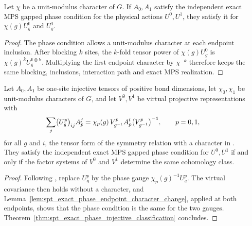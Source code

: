\begin{lemma}
    \label{lem:spt_exact_phase_endpoint_character_change}
    \leanok
    Let $\chi$ be a unit-modulus character of $G$. If $A_0,A_1$ satisfy the
    independent exact MPS gapped phase condition for the physical actions
    $U^0,U^1$, they satisfy it for $\chi(g)U^0_g$ and $U^1_g$.
\end{lemma}
\begin{proof}\leanok
    The phase condition allows a unit-modulus character at each endpoint
    inclusion. After blocking $k$ sites, the $k$-fold tensor power of
    $\chi(g)U^0_g$ is $\chi(g)^kU^{0\otimes k}_g$. Multiplying the first
    endpoint character by $\chi^{-k}$ therefore keeps the same blocking,
    inclusions, interaction path and exact MPS realization.
\end{proof}

\begin{corollary}
    \label{cor:spt_exact_phase_injective_character_classification}
    \leanok
    Let $A_0,A_1$ be one-site injective tensors of positive bond dimensions,
    let $\chi_0,\chi_1$ be unit-modulus characters of $G$, and let
    $V^0,V^1$ be virtual projective representations with
    \begin{align}
        \sum_j\bigl(U^p_g\bigr)_{ij}A_p^j
         & =\chi_p(g)\,V^p_{g^{-1}}A_p^i\bigl(V^p_{g^{-1}}\bigr)^{-1},
        \qquad p=0,1,
        \notag
    \end{align}
    for all $g$ and $i$, the tensor form of the symmetry relation with a
    character in \cite[Appendix~B]{Schuch2011Phases}. They satisfy the independent
    exact MPS gapped phase condition for $U^0,U^1$ if and only if the factor
    systems of $V^0$ and $V^1$ determine the same cohomology class.
\end{corollary}
\begin{proof}\leanok
    Following \cite[Section~II.C.2 and Appendix~B]{Schuch2011Phases},
    replace $U^p_g$ by the phase gauge $\chi_p(g)^{-1}U^p_g$. The virtual
    covariance then holds without a character, and
    Lemma~\ref{lem:spt_exact_phase_endpoint_character_change}, applied at
    both endpoints, shows that the phase condition is the same for the two
    gauges. Theorem~\ref{thm:spt_exact_phase_injective_classification}
    concludes.
\end{proof}


